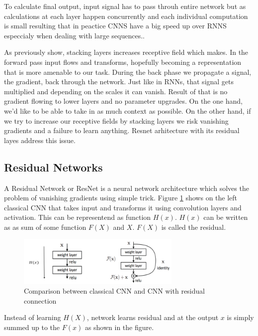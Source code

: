 \documentclass[times, utf8, diplomski, numeric, english]{fer}
\begin{document}
To calculate final output, input signal has to pass throuh entire network but as calculations at each layer happen concurrently and each individual computation is small resulting that in peactice CNNS have a big speed up over RNNS especcialy when dealing with large sequences..

As previously show, stacking layers increases receptive field which makes. In the forward pass input flows and transforms, hopefully becoming a representation that is more amenable to our task. During the back phase we propagate a signal, the gradient, back through the network. Just like in RNNs, that signal gets multiplied and depending on the scales it can vanish. Result of that is no gradient flowing to lower layers and no parameter upgrades. On the one hand, we’d like to be able to take in as much context as possible. On the other hand, if we try to increase our receptive fields by stacking layers we risk vanishing gradients and a failure to learn anything. Resnet arhitecture\cite{resnet} with its residual layes address this issue.



\subsection{Residual Networks}
A Residual Network or ResNet is a neural network architecture which solves the problem of vanishing gradients using simple trick.  
Figure \ref{fg:resnet_block}  shows on the left classical CNN that takes input and transforms it using convolution layers and activation.  This can be representend as function $ H(x) $. 
$ H(x) $ can be written as as sum of some function $F(X)$ and $X$. $  F(X) $ is called the residual.
\begin{figure}[!ht]
	\begin{center}
		\includegraphics[width=0.7\textwidth]{./imgs/resnet_block.png}
		\caption[Comparison between classical CNN and CNN with residual connection ]{Comparison between classical CNN and CNN with residual connection \protect\footnotemark}
		\label{fg:resnet_block}
	\end{center}
\end{figure}
Instead of learning $H(X)$, network learns residual and at the output $x$ is simply summed up to the $F(x)$ as shown in the figure. 
\end{document}
